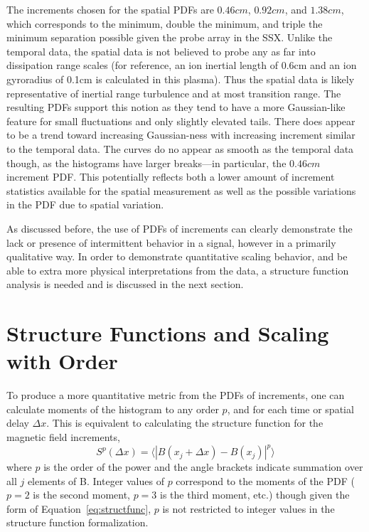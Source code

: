 \documentclass[aps,prl,amsmath,amssymb,reprint,superscriptaddress]{revtex4-1} %
\begin{document}
The increments chosen for the spatial PDFs are $0.46cm$, $0.92cm$, and $1.38cm$, which corresponds to the minimum, double the minimum, and triple the minimum separation possible given the probe array in the SSX. Unlike the temporal data, the spatial data is not believed to probe any as far into dissipation range scales (for reference, an ion inertial length of 0.6cm  and an ion gyroradius of 0.1cm is calculated in this plasma). Thus the spatial data is likely representative of inertial range turbulence and at most transition range. The resulting PDFs support this notion as they tend to have a more Gaussian-like feature for small fluctuations and only slightly elevated tails. There does appear to be a trend toward increasing Gaussian-ness with increasing increment similar to the temporal data. The curves do no appear as smooth as the temporal data though, as the histograms have larger breaks---in particular, the $0.46cm$ increment PDF. This potentially reflects both a lower amount of increment statistics available for the spatial measurement as well as the possible variations in the PDF due to spatial variation. 

As discussed before, the use of PDFs of increments can clearly demonstrate the lack or presence of intermittent behavior in a signal, however in a primarily qualitative way. In order to demonstrate quantitative scaling behavior, and be able to extra more physical interpretations from the data, a structure function analysis is needed and is discussed in the next section.

\section{Structure Functions and Scaling with Order}\label{sec:structs}

To produce a more quantitative metric from the PDFs of increments, one can calculate moments of the histogram to any order $p$, and for each time or spatial delay $\Delta x$. This is equivalent to calculating the structure function for the magnetic field increments,
%
\begin{equation}
S^{p}(\Delta x) = \langle|B(x_{j}+\Delta x)-B(x_{j})|^{p}\rangle
\label{eq:structfunc}
\end{equation}
%
where $p$ is the order of the power and the angle brackets indicate summation over all $j$ elements of B. Integer values of $p$ correspond to the moments of the PDF ($p=2$ is the second moment, $p=3$ is the third moment, etc.) though given the form of Equation~\ref{eq:structfunc}, $p$ is not restricted to integer values in the structure function formalization.
\end{document}

